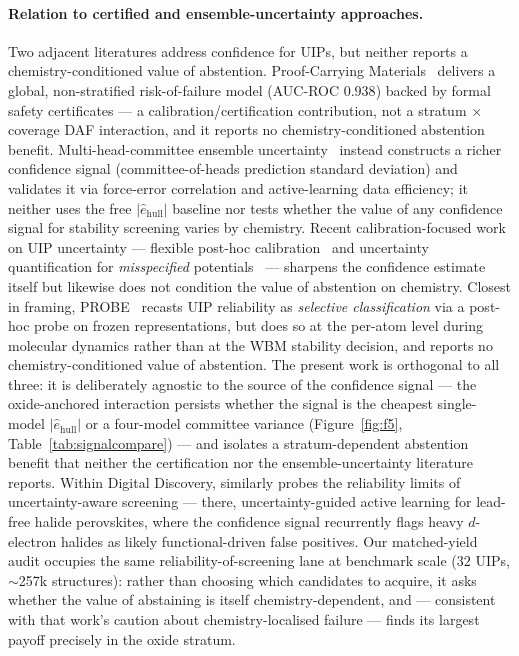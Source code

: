 \documentclass[11pt]{article}
\begin{document}
\paragraph{Relation to certified and ensemble-uncertainty approaches.} Two adjacent
literatures address confidence for UIPs, but neither reports a chemistry-conditioned value of
abstention. Proof-Carrying Materials~\citep{pcm2026} delivers a global, non-stratified
risk-of-failure model (AUC-ROC $0.938$) backed by formal safety certificates --- a
calibration/certification contribution, not a stratum $\times$ coverage DAF interaction, and
it reports no chemistry-conditioned abstention benefit. Multi-head-committee ensemble
uncertainty~\citep{beck2025} instead constructs a richer confidence signal (committee-of-heads
prediction standard deviation) and validates it via force-error correlation and
active-learning data efficiency; it neither uses the free $|\hat{e}_{\mathrm{hull}}|$ baseline
nor tests whether the value of any confidence signal for stability screening varies by
chemistry. Recent calibration-focused work on UIP uncertainty --- flexible post-hoc
calibration~\citep{ho2026flexcalib} and uncertainty quantification for \emph{misspecified}
potentials~\citep{perez2025uqmisspec} --- sharpens the confidence estimate itself but likewise
does not condition the value of abstention on chemistry. Closest in framing,
PROBE~\citep{probe2026} recasts UIP reliability as
\emph{selective classification} via a post-hoc probe on frozen representations, but does so at
the per-atom level during molecular dynamics rather than at the WBM stability decision, and
reports no chemistry-conditioned value of abstention. The present work is orthogonal to all
three: it is deliberately agnostic to the source
of the confidence signal --- the oxide-anchored interaction persists whether the signal is the
cheapest single-model $|\hat{e}_{\mathrm{hull}}|$ or a four-model committee variance
(Figure~\ref{fig:f5}, Table~\ref{tab:signalcompare}) --- and isolates a stratum-dependent
abstention benefit that neither the certification nor the ensemble-uncertainty literature
reports. Within Digital Discovery, \citet{yu2026uaal} similarly probes the reliability
limits of uncertainty-aware screening --- there, uncertainty-guided active learning for
lead-free halide perovskites, where the confidence signal recurrently flags heavy $d$-electron
halides as likely functional-driven false positives. Our matched-yield audit occupies the same
reliability-of-screening lane at benchmark scale ($32$ UIPs, $\sim$257k structures): rather than
choosing which candidates to acquire, it asks whether the value of abstaining is itself
chemistry-dependent, and --- consistent with that work's caution about chemistry-localised
failure --- finds its largest payoff precisely in the oxide stratum.
\end{document}
